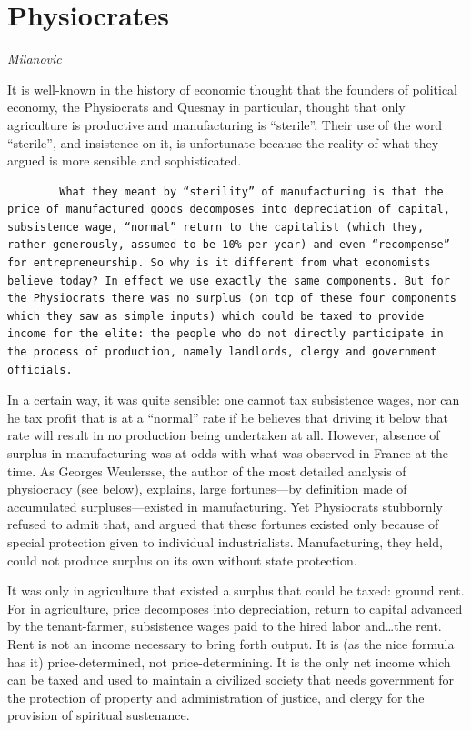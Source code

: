 \documentclass[
]{book}
\begin{document}
\hypertarget{physiocrates}{%
\chapter{Physiocrates}\label{physiocrates}}

\emph{Milanovic}

It is well-known in the history of economic thought that the founders of political economy, the Physiocrats and Quesnay in particular, thought that only agriculture is productive and manufacturing is ``sterile''. Their use of the word ``sterile'', and insistence on it, is unfortunate because the reality of what they argued is more sensible and sophisticated.

\begin{verbatim}
        What they meant by “sterility” of manufacturing is that the price of manufactured goods decomposes into depreciation of capital, subsistence wage, “normal” return to the capitalist (which they, rather generously, assumed to be 10% per year) and even “recompense” for entrepreneurship. So why is it different from what economists believe today? In effect we use exactly the same components. But for the Physiocrats there was no surplus (on top of these four components which they saw as simple inputs) which could be taxed to provide income for the elite: the people who do not directly participate in the process of production, namely landlords, clergy and government officials.
\end{verbatim}

In a certain way, it was quite sensible: one cannot tax subsistence wages, nor can he tax profit that is at a ``normal'' rate if he believes that driving it below that rate will result in no production being undertaken at all. However, absence of surplus in manufacturing was at odds with what was observed in France at the time. As Georges Weulersse, the author of the most detailed analysis of physiocracy (see below), explains, large fortunes---by definition made of accumulated surpluses---existed in manufacturing. Yet Physiocrats stubbornly refused to admit that, and argued that these fortunes existed only because of special protection given to individual industrialists. Manufacturing, they held, could not produce surplus on its own without state protection.

It was only in agriculture that existed a surplus that could be taxed: ground rent. For in agriculture, price decomposes into depreciation, return to capital advanced by the tenant-farmer, subsistence wages paid to the hired labor and\ldots the rent. Rent is not an income necessary to bring forth output. It is (as the nice formula has it) price-determined, not price-determining. It is the only net income which can be taxed and used to maintain a civilized society that needs government for the protection of property and administration of justice, and clergy for the provision of spiritual sustenance.
\end{document}
